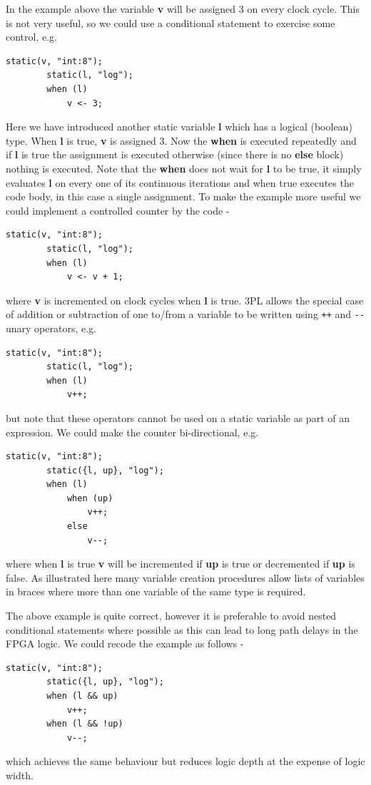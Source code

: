 \documentclass[10pt,a4paper,twoside,fleqn]{article}
\newcommand{\kwd}[1]{{\bf #1}} %
\newcommand{\var}[1]{{\bf #1}} %
\begin{document}
    In the example above the variable \var{v} will be assigned 3 on every clock
    cycle. This is not very useful, so we could use a conditional statement
    to exercise some control, e.g. 
    \begin{lstlisting}[language=threepl]
        static(v, "int:8");
        static(l, "log");
        when (l)
            v <- 3;
    \end{lstlisting}
    Here we have introduced another static variable \var{l} which has a logical
    (boolean) type. When \var{l} is true, \var{v} is assigned 3. Now the
    \kwd{when} is executed repeatedly and if \var{l} is true the assignment is
    executed otherwise (since there is no \kwd{else} block) nothing is executed.
    Note that the \kwd{when} does not wait for \var{l} to be true, it simply
    evaluates \var{l} on every one of its continuous iterations and when
    true executes the code body, in this case a single assignment. To make the
    example more useful we could implement a controlled counter by the code -
    \begin{lstlisting}[language=threepl]
        static(v, "int:8");
        static(l, "log");
        when (l)
            v <- v + 1;
    \end{lstlisting}
    where \var{v} is incremented on clock cycles when \var{l} is true. 3PL
    allows the special case of addition or subtraction of one to/from a variable
    to be written using \verb'++' and \verb'--' unary operators, e.g.
    \begin{lstlisting}[language=threepl]
        static(v, "int:8");
        static(l, "log");
        when (l)
            v++;
    \end{lstlisting}
    but note that these operators cannot be used on a static variable as part
    of an expression. We could make the counter bi-directional, e.g.
    \begin{lstlisting}[language=threepl]
        static(v, "int:8");
        static({l, up}, "log");
        when (l)
            when (up)
                v++;
            else
                v--;
    \end{lstlisting}
    where when \var{l} is true \var{v} will be incremented if \var{up} is true
    or decremented if \var{up} is false. As illustrated here many variable
    creation procedures allow lists of variables in braces where more than
    one variable of the same type is required.
    
    The above example is quite correct, however it is preferable to avoid
    nested conditional statements where possible as this can lead to long
    path delays in the FPGA logic. We could recode the example as follows -
    \begin{lstlisting}[language=threepl]
        static(v, "int:8");
        static({l, up}, "log");
        when (l && up)
            v++;
        when (l && !up)
            v--;
    \end{lstlisting}
    which achieves the same behaviour but reduces logic depth at the expense
    of logic width.
    
\end{document}
